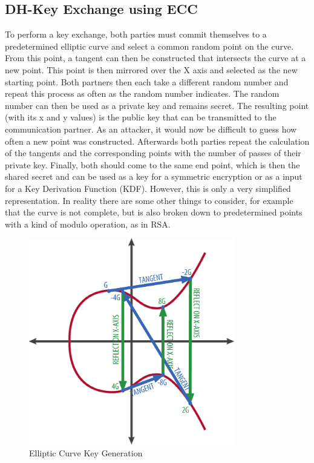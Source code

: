 \documentclass[12pt,oneside,a4paper,parskip]{scrbook}
\begin{document}
\subsection{DH-Key Exchange using ECC}
To perform a key exchange, both parties must commit themselves to a predetermined elliptic curve and select a common random point on the curve. From this point, a tangent can then be constructed that intersects the curve at a new point. This point is then mirrored over the X axis and selected as the new starting point. Both partners then each take a different random number and repeat this process as often as the random number indicates. The random number can then be used as a private key and remains secret. The resulting point (with its x and y values) is the public key that can be transmitted to the communication partner. As an attacker, it would now be difficult to guess how often a new point was constructed. Afterwards both parties repeat the calculation of the tangents and the corresponding points with the number of passes of their private key. Finally, both should come to the same end point, which is then the shared secret and can be used as a key for a symmetric encryption or as a input for a Key Derivation Function (KDF). However, this is only a very simplified representation. In reality there are some other things to consider, for example that the curve is not complete, but is also broken down to predetermined points with a kind of modulo operation, as in RSA. 
\parencite{sullivan_relatively_2013}
\begin{figure}[ht]
 \centering
 \includegraphics[width=0.8\textwidth]{ressources/ecc.png}
 \caption{Elliptic Curve Key Generation \parencite{uszak_elliptic_2017}}
 \label{fig:ecc}
\end{figure}
\end{document}
